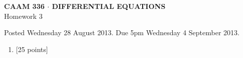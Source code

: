 \documentclass[10pt]{article}
\begin{document}
\vspace*{-5em}
\begin{center}
\large \textsf{\textbf{CAAM 336 $\cdot$ DIFFERENTIAL EQUATIONS}\\[0.5em]
Homework 3 }
\end{center}

Posted Wednesday 28 August 2013.  Due 5pm Wednesday 4 September 2013.

\begin{enumerate}\addtocounter{enumi}{2}
\item {[25 points]} \\ 
\end{enumerate}
\end{document}
